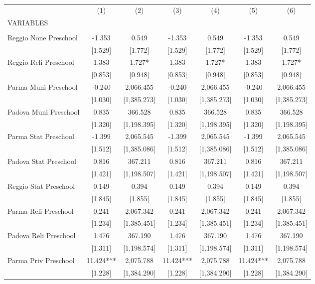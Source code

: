 \begin{tabular}{lcccccc} \hline
 & (1) & (2) & (3) & (4) & (5) & (6) \\
VARIABLES &  &  &  &  &  &  \\ \hline
 &  &  &  &  &  &  \\
Reggio None Preschool & -1.353 & 0.549 & -1.353 & 0.549 & -1.353 & 0.549 \\
 & [1.529] & [1.772] & [1.529] & [1.772] & [1.529] & [1.772] \\
Reggio Reli Preschool & 1.383 & 1.727* & 1.383 & 1.727* & 1.383 & 1.727* \\
 & [0.853] & [0.948] & [0.853] & [0.948] & [0.853] & [0.948] \\
Parma Muni Preschool & -0.240 & 2,066.455 & -0.240 & 2,066.455 & -0.240 & 2,066.455 \\
 & [1.030] & [1,385.273] & [1.030] & [1,385.273] & [1.030] & [1,385.273] \\
Padova Muni Preschool & 0.835 & 366.528 & 0.835 & 366.528 & 0.835 & 366.528 \\
 & [1.320] & [1,198.395] & [1.320] & [1,198.395] & [1.320] & [1,198.395] \\
Parma Stat Preschool & -1.399 & 2,065.545 & -1.399 & 2,065.545 & -1.399 & 2,065.545 \\
 & [1.512] & [1,385.086] & [1.512] & [1,385.086] & [1.512] & [1,385.086] \\
Padova Stat Preschool & 0.816 & 367.211 & 0.816 & 367.211 & 0.816 & 367.211 \\
 & [1.421] & [1,198.507] & [1.421] & [1,198.507] & [1.421] & [1,198.507] \\
Reggio Stat Preschool & 0.149 & 0.394 & 0.149 & 0.394 & 0.149 & 0.394 \\
 & [1.845] & [1.855] & [1.845] & [1.855] & [1.845] & [1.855] \\
Parma Reli Preschool & 0.241 & 2,067.342 & 0.241 & 2,067.342 & 0.241 & 2,067.342 \\
 & [1.234] & [1,385.451] & [1.234] & [1,385.451] & [1.234] & [1,385.451] \\
Padova Reli Preschool & 1.476 & 367.190 & 1.476 & 367.190 & 1.476 & 367.190 \\
 & [1.311] & [1,198.574] & [1.311] & [1,198.574] & [1.311] & [1,198.574] \\
Parma Priv Preschool & 11.424*** & 2,075.788 & 11.424*** & 2,075.788 & 11.424*** & 2,075.788 \\
 & [1.228] & [1,384.290] & [1.228] & [1,384.290] & [1.228] & [1,384.290] \\

\end{tabular}
